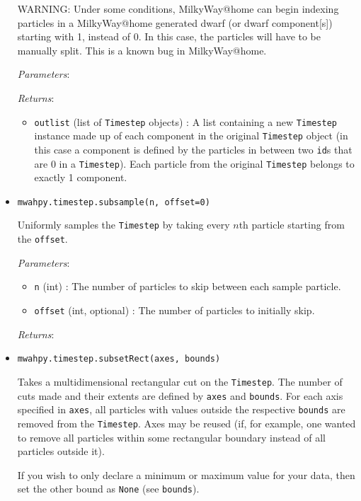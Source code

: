 \documentclass{article}
\begin{document}
\begin{itemize}
WARNING: Under some conditions, MilkyWay@home can begin indexing particles in a MilkyWay@home generated dwarf (or dwarf component[s]) starting with 1, instead of 0. In this case, the particles will have to be manually split. This is a known bug in MilkyWay@home.

\textit{Parameters}:

\textit{Returns}:  \begin{itemize}

\item \verb!outlist! (list of \verb!Timestep! objects) : A list containing a new \verb!Timestep! instance made up of each component in the original \verb!Timestep! object (in this case a component is defined by the particles in between two \verb!id!s that are 0 in a \verb!Timestep!). Each particle from the original \verb!Timestep! belongs to exactly 1 component.

\end{itemize}



\item \verb!mwahpy.timestep.subsample(n, offset=0)!

Uniformly samples the \verb!Timestep! by taking every $n$th particle starting from the \verb!offset!.

\textit{Parameters}: \begin{itemize}

\item \verb!n! (int) : The number of particles to skip between each sample particle.

\item \verb!offset! (int, optional) : The number of particles to initially skip.

\end{itemize}

\textit{Returns}: 



\item \verb!mwahpy.timestep.subsetRect(axes, bounds)!

Takes a multidimensional rectangular cut on the \verb!Timestep!. The number of cuts made and their extents are defined by \verb!axes! and \verb!bounds!. For each axis specified in \verb!axes!, all particles with values outside the respective \verb!bounds! are removed from the \verb!Timestep!. Axes may be reused (if, for example, one wanted to remove all particles within some rectangular boundary instead of all particles outside it).

If you wish to only declare a minimum or maximum value for your data, then set the other bound as \verb!None! (see \verb!bounds!).


\end{itemize}
\end{document}
